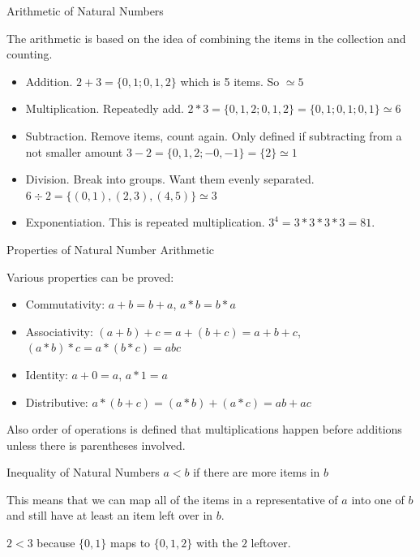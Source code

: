 \documentclass{beamer}
\begin{document}
\begin{frame}{Arithmetic of Natural Numbers}

The arithmetic is based on the idea of combining the items in the collection and counting. 

\pause

\begin{itemize}
\item Addition.  $2 + 3 = \{0, 1; 0, 1, 2\}$ which is 5 items. So $\simeq 5$
\item Multiplication. Repeatedly add. $2*3 =  \{0, 1, 2; 0, 1, 2\} = \{0,1; 0,1; 0,1\} \simeq 6$
\item Subtraction. Remove items, count again. Only defined if subtracting from a not smaller amount $ 3-2 = \{0, 1, 2; -0, -1\} = \{2\} \simeq 1$
\item Division. Break into groups. Want them evenly separated. $6 \div 2 = \{ (0,1), (2,3), (4,5)\} \simeq 3$
\item Exponentiation. This is repeated multiplication. $3^4 =3*3*3*3 = 81$.
\end{itemize} 

\end{frame}

\begin{frame}{Properties of Natural Number Arithmetic}

Various properties can be proved: 
\begin{itemize}
\item Commutativity: $a+b = b+a$, $a*b = b*a$
\item Associativity: $(a+b)+c = a + (b+c) = a+b+c$, $(a*b)*c=a*(b*c)=abc$ 
\item Identity: $a+0 = a$, $a*1 = a$
\item Distributive:  $a*(b+c) = (a*b) + (a*c) = ab + ac$
\end{itemize}
    
Also order of operations is defined that multiplications happen before additions unless there is parentheses involved. 

\end{frame}


\begin{frame}{Inequality of Natural Numbers}
    $a < b$ if there are more items in $b$

    This means that we can map all of the items in a representative of $a$ into one of $b$ and still have at least an item left over in $b$.

    $2 < 3$ because $\{0,1\}$ maps to $\{0, 1, 2\}$ with the $2$ leftover.
    
\end{frame}
\end{document}
